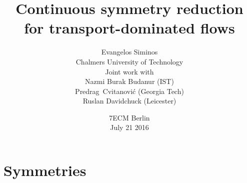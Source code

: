 







\renewcommand{\gSpace}{\ensuremath{\theta}} %
\renewcommand{\zeit}{\tau}

 \usepackage{grffile}

                          \date{{\scriptsize
7ECM Berlin\\
 July 21 2016
                          }}

\title{Continuous symmetry reduction for transport-dominated flows
     }
\author{Evangelos Siminos\\
    Chalmers University of Technology\vspace{60pt}\\
    Joint work with\\ 
    Nazmi Burak Budanur (IST)\\
	Predrag~Cvitanovi\'c (Georgia Tech)\\
	Ruslan Davidchuck (Leicester)
}




\section{Symmetries}

\begin{frame}{}
  \titlepage
\end{frame}


